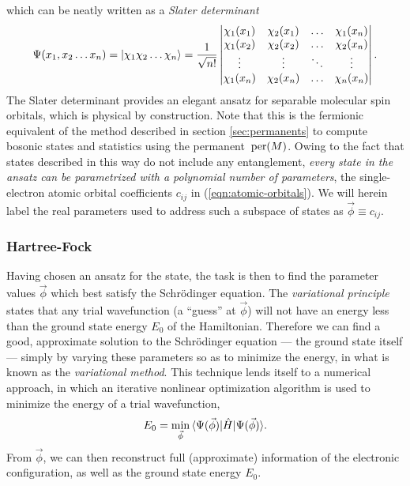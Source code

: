 which can be neatly written as a \emph{Slater determinant}
\begin{equation}
    \Psi(x_1, x_2 \ldots x_n) = 
    \mbox{$ | \chi_1 \chi_2 \ldots \chi_n \rangle $} =
    \frac{1}{\sqrt{n!}}
\begin{vmatrix}
    \chi_1(x_1) & \chi_2(x_1) & \ldots & \chi_1(x_n)  \\
    \chi_1(x_2) & \chi_2(x_2) & \ldots & \chi_2(x_n)  \\
    \vdots      & \vdots      & \ddots & \vdots       \\
    \chi_1(x_n) & \chi_2(x_n) & \ldots & \chi_n(x_n)
\end{vmatrix}.
\label{eqn:slater-determinant}
\end{equation}
The Slater determinant provides an elegant ansatz for separable molecular spin orbitals, which is physical by construction. Note that this is the fermionic equivalent of the method described in section \ref{sec:permanents} to compute bosonic states and statistics using the permanent $\,\mathrm{per}(M)$.
Owing to the fact that states described in this way do not include any entanglement, \emph{every state in the ansatz can be parametrized with a polynomial number of parameters}, the single-electron atomic orbital coefficients $c_{ij}$ in (\ref{eqn:atomic-orbitals}). We will herein label the real parameters used to address such a subspace of states as $\vec{\phi} \equiv c_{ij}$.

\subsubsection{Hartree-Fock}
\label{sec:hartree-fock}
Having chosen an ansatz for the state, the task is then to find the parameter values $\vec{\phi}$ which best satisfy the Schr\"odinger equation. The \emph{variational principle} states that any trial wavefunction (a ``guess'' at $\vec{\phi}$)  will not have an energy less than the ground state energy $E_0$ of the Hamiltonian. Therefore we can find a good, approximate solution to the Schr\"odinger equation --- the ground state itself --- simply by varying these parameters so as to minimize the energy, in what is known as the \emph{variational method}. This technique lends itself to a numerical approach, in which an iterative nonlinear optimization algorithm is used to minimize the energy of a trial wavefunction, 
\begin{equation}
    E_0 = \min_{\vec{\phi}} \mbox{$ \langle \Psi(\vec{\phi}) | $} \hat{H} \mbox{$ | \Psi(\vec{\phi}) \rangle $}.
    \label{eqn:variational-method}
\end{equation}
From $\vec{\phi}$, we can then reconstruct full (approximate) information of the electronic configuration, as well as the ground state energy $E_0$.

